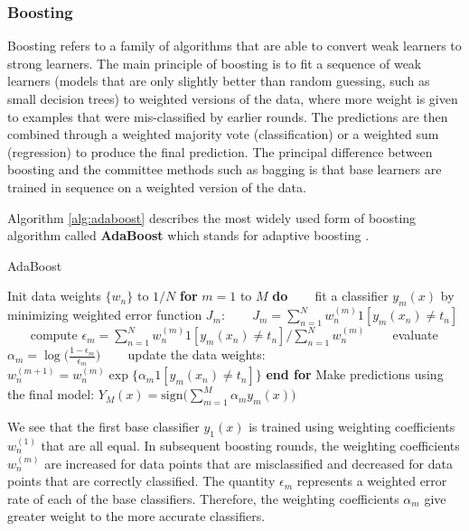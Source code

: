 \subsubsection{Boosting}

Boosting refers to a family of algorithms that are able to convert weak learners to strong learners. The main principle of boosting is to fit a sequence of weak learners (models that are only slightly better than random guessing, such as small decision trees) to weighted versions of the data, where more weight is given to examples that were mis-classified by earlier rounds. The predictions are then combined through a weighted majority vote (classification) or a weighted sum (regression) to produce the final prediction. The principal difference between boosting and the committee methods such as bagging is that base learners are trained in sequence on a weighted version of the data.   

Algorithm \ref{alg:adaboost} describes the most widely used form of boosting algorithm called \textbf{AdaBoost} which stands for adaptive boosting \cite{Freund97}. 

\begin{algorithm}
\caption{AdaBoost}
\label{alg:adaboost}
\begin{algorithmic}[1]
\STATE Init data weights $\{w_n\}$ to $1/N$ 
\STATE \textbf{for} $m = 1$ to $M$ \textbf{do}  
\STATE ~~~ fit a classifier $y_m(x)$ by minimizing weighted error function $J_m$:
\STATE ~~~ $J_m = \sum_{n=1}^{N} w_{n}^{(m)}1[y_m(x_n) \neq t_n]$
\STATE ~~~ compute $\epsilon_m = \sum_{n=1}^{N} w_{n}^{(m)}1[y_m(x_n) \neq t_n] / \sum_{n=1}^{N}w_{n}^{(m)}$
\STATE ~~~ evaluate $\alpha_m = \log \big(\frac{1-\epsilon_m}{\epsilon_m}\big)$
\STATE ~~~ update the data weights: $w_{n}^{(m+1)} = w_{n}^{(m)}\exp\{\alpha_m 1[y_m(x_n) \neq t_n]\}$
\STATE \textbf{end for}
\STATE Make predictions using the final model: $Y_M(x)=\mathrm{sign}\bigg(\sum_{m=1}^{M}\alpha_m y_m(x)\bigg)$ 
\end{algorithmic}
\end{algorithm}

We see that the first base classifier $y_1(x)$ is trained using weighting coefficients $w_{n}^{(1)}$ that are all equal. In subsequent boosting rounds, the weighting coefficients $w_{n}^{(m)}$ are increased for data points that are misclassified and decreased for data points that are correctly classified. The quantity $\epsilon_m$ represents a weighted error rate of each of the base classifiers. Therefore, the weighting coefficients $\alpha_m$ give greater weight to the more accurate classifiers.\\

